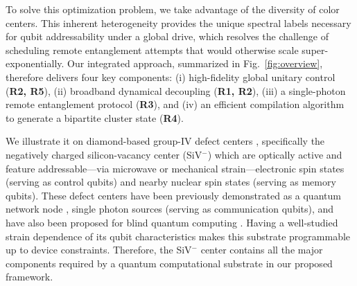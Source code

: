 \documentclass[%
 reprint,
 superscriptaddress,
 amsmath,amssymb,
 aps,
 prx,
]{revtex4-2}
\newcounter{algorithm} %
\begin{document}
To solve this optimization problem, we take advantage of the diversity of color centers. This inherent heterogeneity provides the unique spectral labels necessary for qubit addressability under a global drive, which resolves the challenge of scheduling remote entanglement attempts that would otherwise scale super-exponentially. Our integrated approach, summarized in Fig.~\ref{fig:overview}, therefore delivers four key components: (i) high-fidelity global unitary control (\textbf{R2, R5}), (ii) broadband dynamical decoupling (\textbf{R1, R2}), (iii) a single-photon remote entanglement protocol (\textbf{R3}), and (iv) an efficient compilation algorithm to generate a bipartite cluster state \cite{Nielsen_2006} (\textbf{R4}).


We illustrate it on diamond-based group-IV defect centers \cite{bradac_quantum_2019, PhysRevLett.112.036405, iwasaki_germanium-vacancy_2015, PhysRevLett.118.223603, PhysRevLett.119.253601, PhysRevX.11.041041, PhysRevX.15.021011}, specifically the negatively charged silicon-vacancy center (SiV$^-$) which are optically active \cite{PhysRevB.51.16681, PhysRevLett.77.3041, Sukachev_2017} and feature addressable—via microwave or mechanical strain—electronic spin states \cite{pingault_coherent_2017, PhysRevB.97.205444} (serving as control qubits) and nearby nuclear spin states \cite{PhysRevLett.122.190503, doi:10.1126/science.add9771} (serving as memory qubits). These defect centers have been previously demonstrated as a quantum network node \cite{bhaskar_experimental_2020, doi:10.1126/science.add9771, PRXQuantum.5.010303}, single photon sources \cite{PhysRevLett.113.113602, PhysRevLett.129.053603} (serving as communication qubits), and have also been proposed for blind quantum computing \cite{doi:10.1126/science.adu6894}. Having a well-studied \cite{PhysRevB.97.205444} strain dependence of its qubit characteristics makes this substrate programmable up to device constraints. Therefore, the SiV$^-$ center contains all the major components required by a quantum computational substrate in our proposed framework. 


\end{document}
